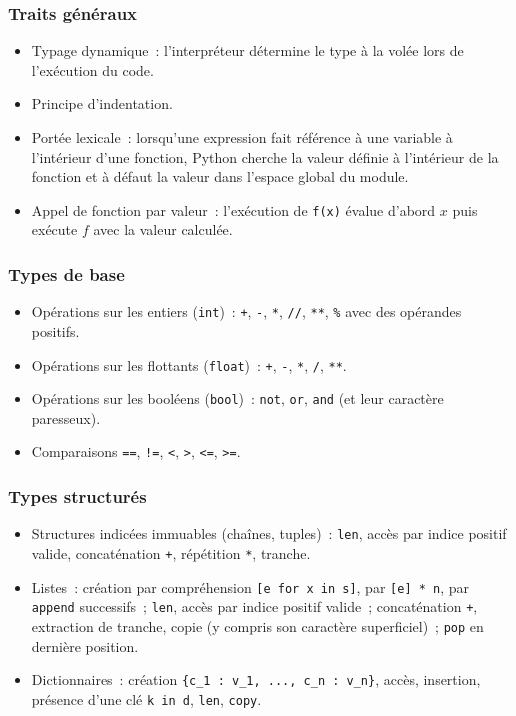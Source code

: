 \documentclass[book]{magnolia}
\begin{document}
\subsubsection*{Traits généraux}
\begin{itemize}
\item Typage dynamique~: l'interpréteur détermine le type à la volée lors de l'exécution du code.
\item Principe d'indentation.
\item Portée lexicale~: lorsqu'une expression fait référence à une variable à l'intérieur d'une fonction, Python cherche la valeur définie à l'intérieur de la fonction et à défaut la valeur dans l'espace global du module.
\item Appel de fonction par valeur~: l'exécution de \verb|f(x)| évalue d'abord $x$ puis exécute $f$ avec la valeur calculée.
\end{itemize}

\subsubsection*{Types de base}
\begin{itemize}
\item Opérations sur les entiers (\verb|int|)~: \verb|+|, \verb|-|, \verb|*|, \verb|//|, \verb|**|, \verb|%| avec des opérandes positifs.
\item Opérations sur les flottants (\verb|float|)~: \verb|+|, \verb|-|, \verb|*|, \verb|/|, \verb|**|.
\item Opérations sur les booléens (\verb|bool|)~: \verb|not|, \verb|or|, \verb|and| (et leur caractère paresseux).
\item Comparaisons \verb|==|, \verb|!=|, \verb|<|, \verb|>|, \verb|<=|, \verb|>=|.
\end{itemize}

\subsubsection*{Types structurés}
\begin{itemize}
\item Structures indicées immuables (chaînes, tuples)~: \verb|len|, accès par indice positif valide, concaténation \verb|+|, répétition \verb|*|, tranche.
\item Listes~: création par compréhension \verb|[e for x in s]|, par \verb|[e] * n|, par \verb|append| successifs~; \verb|len|, accès par indice positif valide~; concaténation \verb|+|, extraction de tranche, copie (y compris son caractère superficiel)~; \verb|pop| en dernière position.
\item Dictionnaires~: création \verb|{c_1 : v_1, ..., c_n : v_n}|, accès, insertion, présence d'une clé \verb|k in d|, \verb|len|, \verb|copy|.
\end{itemize}
\end{document}
